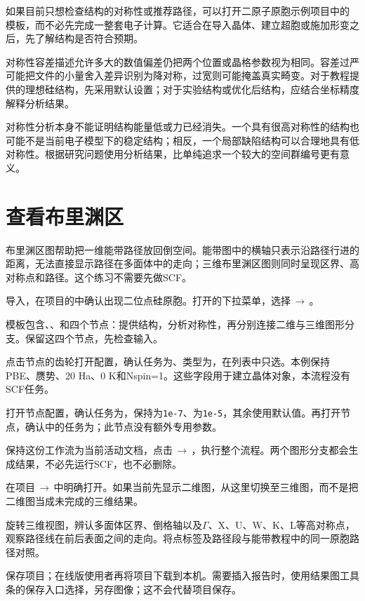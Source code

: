 如果目前只想检查结构的对称性或推荐路径，可以打开二原子原胞示例项目中的  模板，而不必先完成一整套电子计算。它适合在导入晶体、建立超胞或施加形变之后，先了解结构是否符合预期。

对称性容差描述允许多大的数值偏差仍把两个位置或晶格参数视为相同。容差过严可能把文件的小量舍入差异识别为降对称，过宽则可能掩盖真实畸变。对于教程提供的理想硅结构，先采用默认设置；对于实验结构或优化后结构，应结合坐标精度解释分析结果。

对称性分析本身不能证明结构能量低或力已经消失。一个具有很高对称性的结构也可能不是当前电子模型下的稳定结构；相反，一个局部缺陷结构可以合理地具有低对称性。根据研究问题使用分析结果，比单纯追求一个较大的空间群编号更有意义。

\section{查看布里渊区}\label{sec:bz-workflow}

布里渊区图帮助把一维能带路径放回倒空间。能带图中的横轴只表示沿路径行进的距离，无法直接显示路径在多面体中的走向；三维布里渊区图则同时呈现区界、高对称点和路径。这个练习不需要先做SCF。



\begin{steps}
\item 导入，在项目的中确认出现二位点硅原胞。打开的下拉菜单，选择\,$\rightarrow$\,。
\item 模板包含、、和四个节点：提供结构，分析对称性，再分别连接二维与三维图形分支。保留这四个节点，先检查输入。
\item 点击节点的齿轮打开配置，确认任务为、类型为，在列表中只选。本例保持PBE、赝势、20 Ha、0 K和Nspin=1。这些字段用于建立晶体对象，本流程没有SCF任务。
\item 打开节点配置，确认任务为，保持为\texttt{1e-7}、为\texttt{1e-5}，其余使用默认值。再打开节点，确认中的任务为；此节点没有额外专用参数。
\item 保持这份工作流为当前活动文档，点击\,$\rightarrow$\,，执行整个流程。两个图形分支都会生成结果，不必先运行SCF，也不必删除。
\item 在项目\,$\rightarrow$\,中明确打开。如果当前先显示二维图，从这里切换至三维图，而不是把二维图当成未完成的三维结果。
\item 旋转三维视图，辨认多面体区界、倒格轴以及$\Gamma$、X、U、W、K、L等高对称点，观察路径线在前后表面之间的走向。将点标签及路径段与能带教程中的同一原胞路径对照。
\item 保存项目；在线版使用者再将项目下载到本机。需要插入报告时，使用结果图工具条的保存入口选择，另存图像；这不会代替项目保存。
\end{steps}

